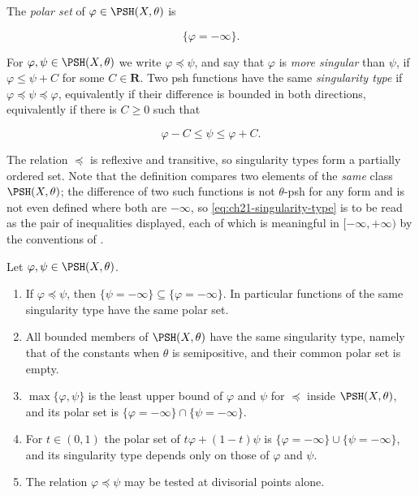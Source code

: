 \begin{definition}
\label{def:ch21-polar-singularity}
The \emph{polar set} of \(\varphi\in\PSH(X,\theta)\) is

\[
                         \{\varphi=-\infty\}.
\]

For \(\varphi,\psi\in\PSH(X,\theta)\) we write \(\varphi\preceq\psi\), and
say that \(\varphi\) is \emph{more singular} than \(\psi\), if
\(\varphi\leq\psi+C\) for some \(C\in\mathbf R\).  Two psh functions have
the same \emph{singularity type} if
\(\varphi\preceq\psi\preceq\varphi\), equivalently if their difference
is bounded in both directions, equivalently if there is \(C\geq0\) such that

\begin{equation}
\label{eq:ch21-singularity-type}
                         \varphi-C\leq\psi\leq\varphi+C.
\end{equation}
\end{definition}

The relation \(\preceq\) is reflexive and transitive, so singularity types
form a partially ordered set.  Note that the definition compares two
elements of the \emph{same} class \(\PSH(X,\theta)\); the difference of two
such functions is not \(\theta\)-psh for any form and is not even defined
where both are \(-\infty\), so \eqref{eq:ch21-singularity-type} is to be
read as the pair of inequalities displayed, each of which is meaningful in
\([-\infty,+\infty)\) by the conventions of
.

\begin{proposition}
\label{prop:ch21-singularity-elementary}
Let \(\varphi,\psi\in\PSH(X,\theta)\).
\begin{enumerate}
\item\label{itm:ch21-sing:polar}
If \(\varphi\preceq\psi\), then
\(\{\psi=-\infty\}\subseteq\{\varphi=-\infty\}\).  In particular functions
of the same singularity type have the same polar set.
\item\label{itm:ch21-sing:bounded}
All bounded members of \(\PSH(X,\theta)\) have the same singularity type,
namely that of the constants when \(\theta\) is semipositive, and their
common polar set is empty.
\item\label{itm:ch21-sing:max}
\(\max\{\varphi,\psi\}\) is the least upper bound of \(\varphi\) and
\(\psi\) for \(\preceq\) inside \(\PSH(X,\theta)\), and its polar set is
\(\{\varphi=-\infty\}\cap\{\psi=-\infty\}\).
\item\label{itm:ch21-sing:convex}
For \(t\in(0,1)\) the polar set of \(t\varphi+(1-t)\psi\) is
\(\{\varphi=-\infty\}\cup\{\psi=-\infty\}\), and its singularity type
depends only on those of \(\varphi\) and \(\psi\).
\item\label{itm:ch21-sing:divisorial}
The relation \(\varphi\preceq\psi\) may be tested at divisorial points
alone.
\end{enumerate}
\end{proposition}


